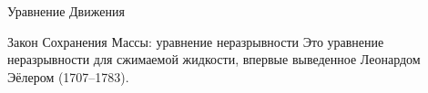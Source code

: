 \begin{chapter}{Уравнение Движения}
\begin{section}{Закон Сохранения Массы: уравнение неразрывности}
Это уравнение неразрывности для сжимаемой жидкости, впервые выведенное
Леонардом Эёлером (1707--1783).
%

\end{section}
\end{chapter}
